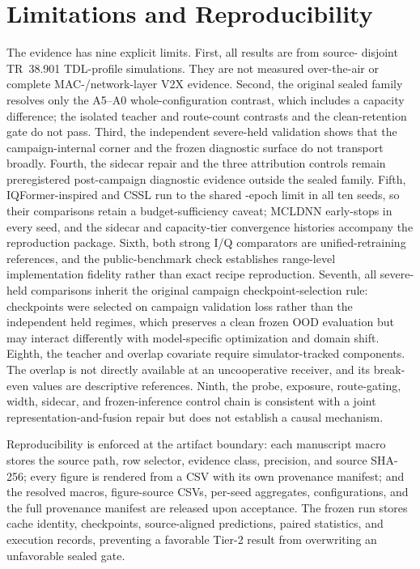 \documentclass[letterpaper,journal]{IEEEtran}
\begin{document}
\section{Limitations and Reproducibility}
The evidence has nine explicit limits. First, all results are from source-
disjoint TR~38.901 TDL-profile simulations. They are not measured over-the-air
or complete MAC-/network-layer V2X evidence. Second, the original sealed family
resolves only the A5--A0 whole-configuration contrast, which includes a
capacity difference; the isolated teacher and route-count contrasts and the
clean-retention gate do not pass. Third, the
independent severe-held validation shows that the campaign-internal corner and
the frozen diagnostic surface do not transport broadly. Fourth, the sidecar
repair and the three attribution controls remain preregistered post-campaign
diagnostic evidence outside the sealed family. Fifth, IQFormer-inspired and
CSSL run to the shared \TrainEpochs-epoch limit in all ten seeds, so their
comparisons retain a budget-sufficiency caveat; MCLDNN early-stops in every
seed, and the sidecar and capacity-tier convergence histories accompany the
reproduction package. Sixth, both strong
I/Q comparators are unified-retraining references, and the public-benchmark
check establishes range-level implementation fidelity rather than exact recipe
reproduction. Seventh, all severe-held comparisons inherit the original
campaign checkpoint-selection rule: checkpoints were selected on campaign
validation loss rather than the independent held regimes, which preserves a
clean frozen OOD evaluation but may interact differently with model-specific
optimization and domain shift. Eighth, the teacher and overlap covariate
require simulator-tracked components. The overlap is not directly available at
an uncooperative receiver, and its break-even values are descriptive
references. Ninth, the probe, exposure, route-gating, width, sidecar, and
frozen-inference control chain is consistent with a joint
representation-and-fusion repair but does not establish a causal mechanism.

Reproducibility is enforced at the artifact boundary: each manuscript macro
stores the source path, row selector, evidence class, precision, and source
SHA-256; every figure is rendered from a CSV with its own provenance
manifest; and the resolved macros, figure-source CSVs, per-seed aggregates,
configurations, and the full provenance manifest are released upon
acceptance. The frozen run stores cache identity, checkpoints,
source-aligned predictions, paired statistics, and execution records,
preventing a favorable Tier-2 result from overwriting an unfavorable sealed
gate.
\end{document}

